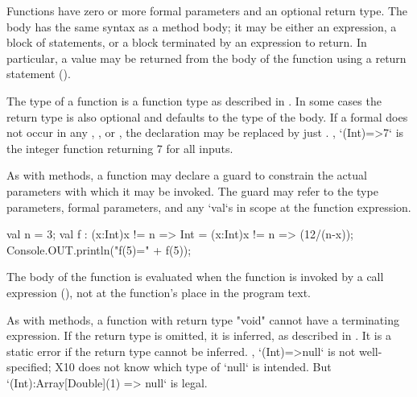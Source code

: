 Functions have zero or more formal parameters and an optional return type.
The body has the 
same syntax as a method body; it may be either an expression, a block
of statements, or a block terminated by an expression to return. In
particular, a value may be returned from the body of the function
using a return statement (). 

The type of a function is a function type as described in .  In some
cases the 
return type  is also optional and defaults to the type of the
body. If a formal  does not occur in any
, ,  or , the declaration  may
be replaced by just . \Eg,  \xcd`(Int)=>7` is the integer function returning
7 for all inputs.

\label{ClosureGuard}


As with methods, a function may declare a guard to
constrain the actual parameters with which it may be invoked.
The guard may refer to the type parameters, formal parameters,
and any \xcd`val`s in scope at the function expression.

\begin{ex}
\begin{xten}
    val n = 3;
    val f : (x:Int){x != n} => Int  
          = (x:Int){x != n} => (12/(n-x));
    Console.OUT.println("f(5)=" + f(5));    
\end{xten}

\end{ex}

The body of the function is evaluated when the function is
invoked by a call expression (), not at the function's
place in the program text.

As with methods, a function with return type \xcd"void" cannot
have a terminating expression. 
If the return type is omitted, it is inferred, as described in
.
It is a static error if the return type cannot be inferred.  \Eg,
\xcd`(Int)=>null` is not well-specified; X10 does not know which type of
\xcd`null` is intended.  
But \xcd`(Int):Array[Double](1) => null` is legal.


